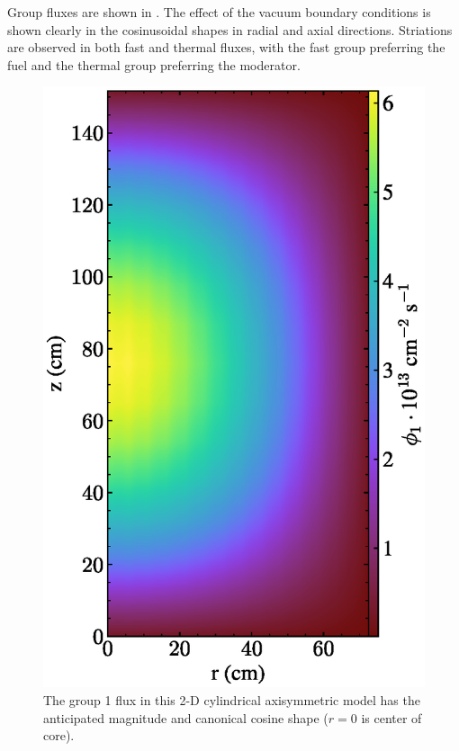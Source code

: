 \documentclass{article}
\begin{document}
Group fluxes are shown in . The effect of the vacuum
boundary conditions is shown clearly in the cosinusoidal shapes in radial and
axial directions. Striations are observed in both fast and thermal fluxes, with
the fast group preferring the fuel and the thermal group preferring the moderator.

\begin{figure}[htpb]
  \centering
  \includegraphics{2d_gamma_heating_group1.eps}
        \caption{The group 1 flux in this 2-D cylindrical axisymmetric model
        has the anticipated magnitude and canonical cosine shape ($r=0$ is center of core). }
  \label{fig:group1}
\end{figure}
\end{document}
